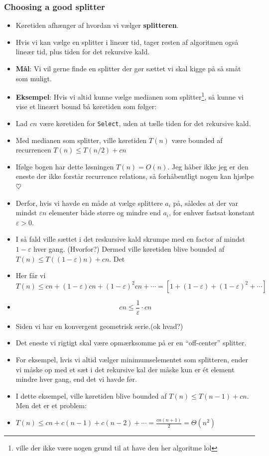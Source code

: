 \documentclass{beamer}
\begin{document}
\begin{frame}[allowframebreaks]
  \frametitle{Choosing a good splitter}
  \begin{itemize}
  \item Køretiden afhænger af hvordan vi vælger \textbf{splitteren}.
  \item Hvis vi kan vælge en splitter i lineær tid, tager resten af algoritmen også lineær tid, plus tiden for det rekursive kald. 
  \item \textbf{Mål}: Vi vil gerne finde en splitter der gør sættet vi skal kigge på så småt som muligt.
  \item \textbf{Eksempel}: Hvis vi altid kunne vælge medianen som splitter\footnote{ville der ikke være nogen grund til at have den her algoritme lol}, så kunne vi vise et lineært bound bå køretiden som følger:
  \item Lad $cn$ være køretiden for \texttt{Select}, uden at tælle tiden for det rekursive kald. 
  \item Med medianen som splitter, ville køretiden $T(n)$ være bounded af recurrencen $T(n) \leq T(n/2) + cn$
  \item Ifølge bogen har dette løsningen $T(n) = O(n)$. Jeg håber ikke jeg er den eneste der ikke forstår recurrence relations, så forhåbentligt nogen kan hjælpe $\heartsuit$
  \item Derfor, hvis vi havde en måde at vælge splittere $a_{i}$ på, således at der var mindst $\varepsilon n$ elementer både større og mindre end $a_{i}$, for enhver fastsat konstant $\varepsilon > 0$.
  \item I så fald ville sættet i det reskursive kald skrumpe med en factor af mindst $1 - \varepsilon$ hver gang. (Hvorfor?) Dermed ville køretiden blive bounded af $T(n) \leq T((1 - \varepsilon)n)+cn$. Det 
  \item Her får vi \[ T(n) \leq cn + (1- \varepsilon) cn + (1- \varepsilon)^{2}cn + \cdots = \left[ 1 + (1- \varepsilon) + (1 - \varepsilon)^{2} + \cdots \right] \]
  \item \[ cn \leq \frac{1}{\varepsilon} \cdot cn \]
  \item Siden vi har en konvergent geometrisk serie.(ok hvad?)
  \item Det eneste vi rigtigt skal være opmærksomme på er en ``off-center'' splitter. 
  \item For eksempel, hvis vi altid vælger minimumselementet som splitteren, ender vi måske op med et sæt i det rekursive kal der måske kun er ét element mindre hver gang, end det vi havde før.
  \item I dette eksempel, ville køretiden blive bounded af $T(n) \leq T(n-1) + cn$. Men det er et problem:
  \item $T(n) \leq cn + c(n-1) + c(n-2) + \cdots = \frac{cn(n+1)}{2} = \Theta (n^{2})$
  \end{itemize}
\end{frame}
\end{document}
